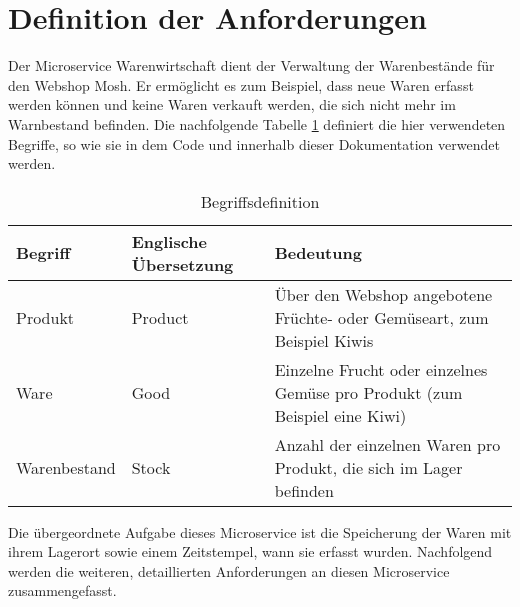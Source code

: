 \section{Definition der Anforderungen}
\label{sec: Definition der Anforderungen}

Der Microservice Warenwirtschaft dient der Verwaltung der Warenbestände für den Webshop Mosh. Er ermöglicht es zum Beispiel, dass neue Waren erfasst werden können und keine Waren verkauft werden, die sich nicht mehr im Warnbestand befinden.  Die nachfolgende Tabelle \ref{tabl:Begriffe} definiert die hier verwendeten Begriffe, so wie sie in dem Code und innerhalb dieser Dokumentation verwendet werden.
\begin{table}[H]
\begin{small}
	\begin{center}
  	\caption{Begriffsdefinition}
   	\renewcommand{\arraystretch}{1.2}
    \begin{tabularx}{\textwidth}{|X|X|X|}		
    
    \hline
    			
    \textbf{Begriff} & \textbf{Englische Übersetzung} &\textbf{Bedeutung}\\ \hline
    
    Produkt & Product & Über den Webshop angebotene Früchte- oder Gemüseart, zum Beispiel Kiwis\\ \hline
	Ware & Good & Einzelne Frucht oder einzelnes Gemüse pro Produkt (zum Beispiel eine Kiwi)\\ \hline
	Warenbestand & Stock & Anzahl der einzelnen Waren pro Produkt, die sich im Lager befinden\\ \hline
    
	\end{tabularx}
	\label{tabl:Begriffe}
	\end{center}
\end{small}
\end{table}

\newpage
Die übergeordnete Aufgabe dieses Microservice ist die Speicherung der Waren mit ihrem Lagerort sowie einem Zeitstempel, wann sie erfasst wurden. Nachfolgend werden die weiteren, detaillierten Anforderungen an diesen Microservice zusammengefasst. 

